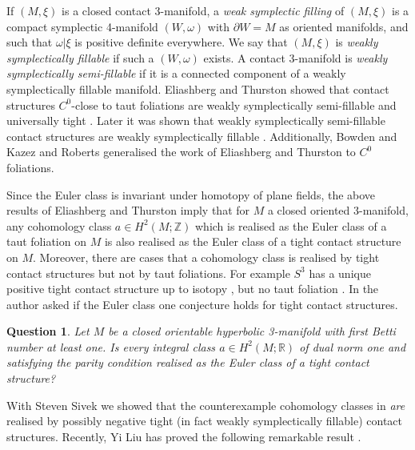 \documentclass[11pt]{amsart}
\newtheorem{question}[thm]{Question}
\theoremstyle{remark}
\theoremstyle{definition}
\begin{document}
	If $(M , \xi)$ is a closed contact 3-manifold, a \emph{weak symplectic filling} of $(M, \xi)$ is a compact symplectic 4-manifold $(W, \omega)$ with $\partial W = M$ as oriented manifolds, and such that $\omega |\xi$ is positive definite everywhere. We say that $(M , \xi)$ is \emph{weakly symplectically fillable} if such a $(W , \omega)$ exists. A contact 3-manifold is \emph{weakly symplectically semi-fillable} if it is a connected component of a weakly symplectically fillable manifold.
	Eliashberg and Thurston \cite{eliashberg1998confoliations} showed that contact structures $C^0$-close to taut foliations are weakly symplectically semi-fillable and universally tight \cite[Corollaries 3.2.5 and 3.2.8]{eliashberg1998confoliations}. Later it was shown that weakly symplectically semi-fillable contact structures are weakly symplectically fillable \cite{eliashberg2004few, etnyre2004symplectic}. Additionally, Bowden \cite{bowden2016approximating} and Kazez and Roberts \cite{kazez2015approximating} generalised the work of Eliashberg and Thurston to $C^0$ foliations.  
	
	Since the Euler class is invariant under homotopy of plane fields, the above results of Eliashberg and Thurston imply that for $M$ a closed oriented 3-manifold, any cohomology class $a \in H^2(M ; \mathbb{Z})$ which is realised as the Euler class of a taut foliation on $M$ is also realised as the Euler class of a tight contact structure on $M$. Moreover, there are cases that a cohomology class is realised by tight contact structures but not by taut foliations. For example $S^3$ has a unique positive tight contact structure up to isotopy \cite{bennequin1982entrelacements, eliashberg1992contact}, but no taut foliation \cite{novikov1965topology}. In \cite{yazdi2020thurston} the author asked if the Euler class one conjecture holds for tight contact structures. 
	
	\begin{question}
		Let $M$ be a closed orientable hyperbolic 3-manifold with first Betti number at least one. Is every integral class $a \in H^2(M ; \mathbb{R})$ of dual norm one and satisfying the parity condition realised as the Euler class of a tight contact structure?
		\label{que:euler class one for tight contact structures}
	\end{question}
	
	With Steven Sivek \cite{sivek2023thurston} we showed that the counterexample cohomology classes in \cite{yazdi2020thurston} \emph{are} realised by possibly negative tight (in fact weakly symplectically fillable) contact structures. Recently, Yi Liu has proved the following remarkable result \cite{liu2024euler}.
	
\end{document}
